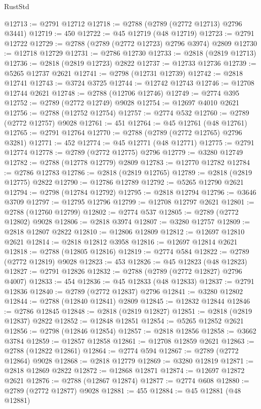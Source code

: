 \begin{lexlean}{RustStd}
\begin{coremodule}
@12713 := @2791 @12712
@12718 := @2788 (@2789 (@2772 @12713) @2796 @3441)
@12719 := 450
@12722 := @45 @12719 (@48 @12719)
@12723 := @2791 @12722
@12729 := @2788 (@2789 (@2772 @12723) @2796 @3974) @2809
@12730 := @12718 @12729
@12731 := @2786 @12730
@12733 := @2818 (@2819 @12713)
@12736 := @2818 (@2819 @12723) @2822
@12737 := @12733 @12736
@12739 := @5265 @12737 @2621
@12741 := @2798 (@12731 @12739)
@12742 := @2818 @12741
@12743 := @3724 @3725
@12744 := @12742 @12743
@12746 := @12708 @12744 @2621
@12748 := @2788 (@12706 @12746)
@12749 := @2774 @395
@12752 := @2789 (@2772 @12749) @9028
@12754 := @12697 @4010 @2621
@12756 := @2788 (@12752 @12754)
@12757 := @2774 @532
@12760 := @2789 (@2772 @12757) @9028
@12761 := 451
@12764 := @45 @12761 (@48 @12761)
@12765 := @2791 @12764
@12770 := @2788 (@2789 (@2772 @12765) @2796 @3281)
@12771 := 452
@12774 := @45 @12771 (@48 @12771)
@12775 := @2791 @12774
@12778 := @2789 (@2772 @12775) @2796
@12779 := @3280 @12749
@12782 := @2788 (@12778 @12779) @2809
@12783 := @12770 @12782
@12784 := @2786 @12783
@12786 := @2818 (@2819 @12765)
@12789 := @2818 (@2819 @12775) @2822
@12790 := @12786 @12789
@12792 := @5265 @12790 @2621
@12794 := @2798 (@12784 @12792)
@12795 := @2818 @12794
@12796 := @3646 @3709
@12797 := @12795 @12796
@12799 := @12708 @12797 @2621
@12801 := @2788 (@12760 @12799)
@12802 := @2774 @537
@12805 := @2789 (@2772 @12802) @9028
@12806 := @2818 @3974
@12807 := @3280 @12757
@12809 := @2818 @12807 @2822
@12810 := @12806 @12809
@12812 := @12697 @12810 @2621
@12814 := @2818 @12812 @3958
@12816 := @12697 @12814 @2621
@12818 := @2788 (@12805 @12816)
@12819 := @2774 @584
@12822 := @2789 (@2772 @12819) @9028
@12823 := 453
@12826 := @45 @12823 (@48 @12823)
@12827 := @2791 @12826
@12832 := @2788 (@2789 (@2772 @12827) @2796 @4007)
@12833 := 454
@12836 := @45 @12833 (@48 @12833)
@12837 := @2791 @12836
@12840 := @2789 (@2772 @12837) @2796
@12841 := @3280 @12802
@12844 := @2788 (@12840 @12841) @2809
@12845 := @12832 @12844
@12846 := @2786 @12845
@12848 := @2818 (@2819 @12827)
@12851 := @2818 (@2819 @12837) @2822
@12852 := @12848 @12851
@12854 := @5265 @12852 @2621
@12856 := @2798 (@12846 @12854)
@12857 := @2818 @12856
@12858 := @3662 @3784
@12859 := @12857 @12858
@12861 := @12708 @12859 @2621
@12863 := @2788 (@12822 @12861)
@12864 := @2774 @594
@12867 := @2789 (@2772 @12864) @9028
@12868 := @2818 @12779
@12869 := @3280 @12819
@12871 := @2818 @12869 @2822
@12872 := @12868 @12871
@12874 := @12697 @12872 @2621
@12876 := @2788 (@12867 @12874)
@12877 := @2774 @608
@12880 := @2789 (@2772 @12877) @9028
@12881 := 455
@12884 := @45 @12881 (@48 @12881)

\end{coremodule}
\end{lexlean}
